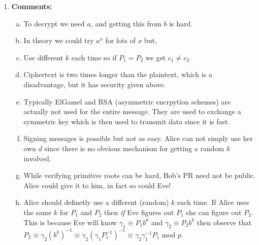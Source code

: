 \documentclass[class=article, crop=false]{standalone}
\begin{document}
\begin{enumerate}
	\item \textbf{Comments:}
	\begin{enumerate}[(a)]
		\item To decrypt we need $a$, and getting this from $b$ is hard.
		\item In theory we could try $a^x$ for lots of $x$ but,
		\item Use different $k$ each time so if $P_1 = P_2$ we get $c_1\neq c_2$.
		\item Ciphertext is two times longer than the plaintext, which is a disadvantage,
		but it has security given above.
		\item Typically ElGamel and RSA (asymmetric encrpytion schemes) are actually not used for the entire message.
		They are used to exchange a symmetric key which is then used to transmit data since
		it is fast.
		\item Signing messages is possible but not as easy. Alice can not simply use her own $d$
		since there is no obvious mechanism for getting a random $k$ involved.
		\item While verifying primitive roots can be hard, Bob's PR need not be public.
		Alice could give it to him, in fact so could Eve!
		\item Alice should definetly use a different (random) $k$ each time.
		If Alice uses the same $k$ for $P_1$ and $P_2$ then \textit{if} Eve figures out $P_1$
		she can figure out $P_2$. This is because Eve will know
		$\gamma_1\equiv P_1b^k$ and $\gamma_2\equiv P_2b^k$ then observe that
		$P_2\equiv \gamma_2(b^k)^{-1}\equiv \gamma_2\left(\gamma_1 P_1^{-1}\right)^{-1}
		\equiv \gamma_2\gamma_1^{-1}P_1\mbox{ mod }p$.
	\end{enumerate}

\end{enumerate}


\end{document}
